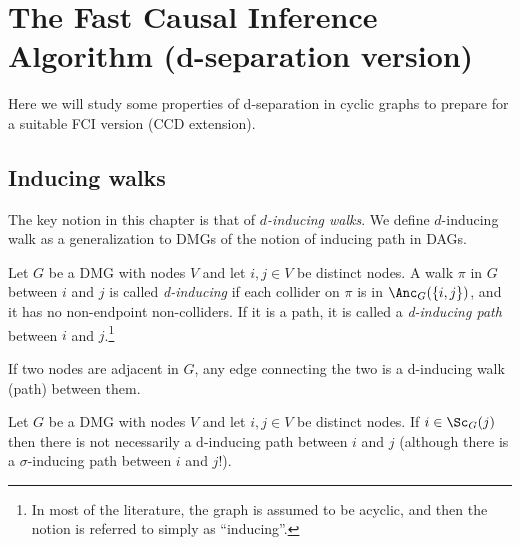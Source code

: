 \section{The Fast Causal Inference Algorithm (d-separation version)}\label{sec:fci}

Here we will study some properties of d-separation in cyclic graphs to prepare for a suitable FCI version (CCD extension).

\subsection{Inducing walks}

The key notion in this chapter is that of \emph{$d$-inducing walks}.
We define $d$-inducing walk as a generalization to DMGs of the notion of inducing path \cite{VermaPearl1990} in DAGs. %
\begin{Def}\label{def:d-inducing_path}
Let $G$ be a DMG with nodes $V$ and let $i,j \in V$ be distinct nodes.
A walk $\pi$ in $G$ between $i$ and $j$ is called \emph{d-inducing} if each collider on $\pi$ is in $\Anc_{G}(\{i,j\})$,
and it has no non-endpoint non-colliders. %
If it is a path, it is called a \emph{d-inducing path} between $i$ and $j$.\footnote{In most of the literature, the graph is assumed to be acyclic, and then the notion is referred to simply as ``inducing''.}
\end{Def}
If two nodes are adjacent in $G$, any edge connecting the two is a d-inducing walk (path) between them.
\begin{Rem}
Let $G$ be a DMG with nodes $V$ and let $i,j \in V$ be distinct nodes.
If $i \in \Sc_G(j)$ then there is not necessarily a d-inducing path between $i$ and $j$ (although there is a $\sigma$-inducing path between $i$ and $j$!).
\end{Rem}

